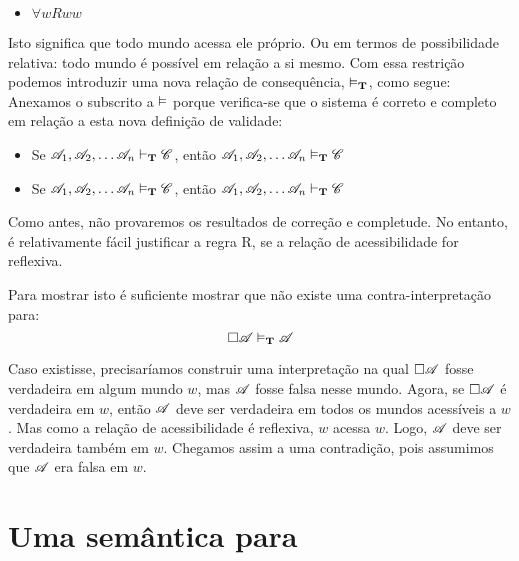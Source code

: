 \begin{itemize}
	\item $\forall wRww$
\end{itemize}
Isto significa que todo mundo acessa ele próprio. Ou em termos de possibilidade relativa: todo mundo é possível em relação a si mesmo. Com   essa restrição podemos introduzir uma nova relação de consequência, $\vDash_{\mathbf{T}}$, como segue:
Anexamos o subscrito \mlT{}  a $\vDash$ porque verifica-se que o sistema \mlT{} é correto e completo em relação a esta nova definição de validade:
\begin{itemize}
	\item Se $\mathscr{A}_1,\mathscr{A}_2, \dots \mathscr{A}_n\vdash_{\mathbf{T}}\mathscr{C}$, então $\mathscr{A}_1,\mathscr{A}_2, \dots \mathscr{A}_n\vDash_{\mathbf{T}}\mathscr{C}$
	\item Se $\mathscr{A}_1,\mathscr{A}_2, \dots \mathscr{A}_n\vDash_{\mathbf{T}}\mathscr{C}$, então $\mathscr{A}_1,\mathscr{A}_2, \dots \mathscr{A}_n\vdash_{\mathbf{T}}\mathscr{C}$
\end{itemize}
Como antes, não provaremos os resultados de correção e completude. No entanto, é relativamente fácil  justificar a regra  R\mlT, se a relação de acessibilidade for 
reflexiva.

Para mostrar isto é suficiente mostrar que não existe uma  contra-interpretação para:
\[
	\Box \mathscr{A}\vDash_{\mathbf{T}} \mathscr{A}
\]
 

Caso existisse,  precisaríamos construir  uma interpretação  na qual $\Box \mathscr{A}$ fosse verdadeira em algum  mundo  $w$, mas $\mathscr{A}$ fosse falsa nesse mundo. Agora, se $\Box \mathscr{A}$ é verdadeira em $w$, então $\mathscr{A}$ deve ser verdadeira em todos os mundos acessíveis a $w$. Mas como a relação de acessibilidade é reflexiva, $w$ acessa $w$. Logo, $\mathscr{A}$ deve ser verdadeira também em $w$. 
Chegamos assim a uma contradição,  pois assumimos que
  $\mathscr{A}$ era falsa em $w$. 

\section{Uma semântica para \mlSfour}
\label{SemanticsS4}

